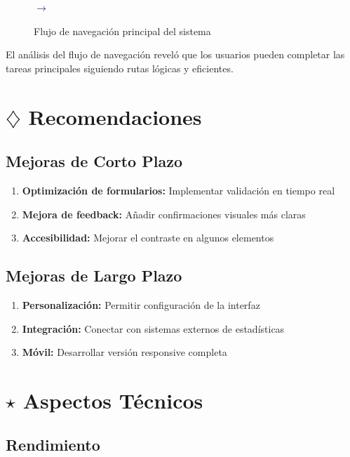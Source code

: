 \documentclass[12pt,a4paper]{article}
\begin{document}
\begin{figure}[H]
\centering
\textcolor{darkblue}{$\rightarrow$}
\caption{Flujo de navegación principal del sistema}
\end{figure}

El análisis del flujo de navegación reveló que los usuarios pueden completar las tareas principales siguiendo rutas lógicas y eficientes.

\section{$\diamondsuit$ Recomendaciones}

\subsection{Mejoras de Corto Plazo}

\begin{enumerate}
    \item \textbf{Optimización de formularios:} Implementar validación en tiempo real
    \item \textbf{Mejora de feedback:} Añadir confirmaciones visuales más claras
    \item \textbf{Accesibilidad:} Mejorar el contraste en algunos elementos
\end{enumerate}

\subsection{Mejoras de Largo Plazo}

\begin{enumerate}
    \item \textbf{Personalización:} Permitir configuración de la interfaz
    \item \textbf{Integración:} Conectar con sistemas externos de estadísticas
    \item \textbf{Móvil:} Desarrollar versión responsive completa
\end{enumerate}

\section{$\star$ Aspectos Técnicos}

\subsection{Rendimiento}
\end{document}
